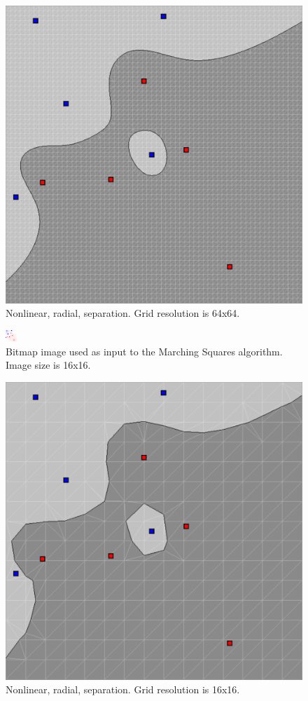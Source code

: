 \documentclass[12pt]{article}
\begin{document}
\begin{figure} 
\centering
  \includegraphics[width = 3 in]{64_res.png}
  \caption{Nonlinear, radial, separation. Grid resolution is 64x64.
}
\end{figure}


\begin{figure} 
\centering
  \includegraphics[width = 3 in]{16_res_image.png}
  \caption{Bitmap image used as input to the Marching Squares algorithm.
Image size is 16x16.
}
\end{figure}


\begin{figure} 
\centering
  \includegraphics[width = 3 in]{16_res.png}
  \caption{Nonlinear, radial, separation. Grid resolution is 16x16.
}
\end{figure}
\end{document}
